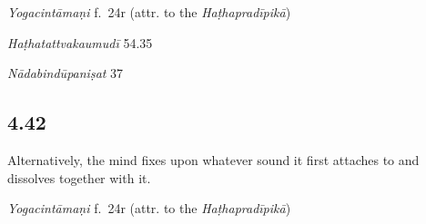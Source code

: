 \begin{ekdosis}

\begin{testimonia}[hp04_041]
\emph{Yogacintāmaṇi} f.~24r (attr. to the \emph{Haṭhapradīpikā})
\begin{versinnote}
\end{versinnote}

\emph{Haṭhatattvakaumudī} 54.35
\begin{versinnote}
\end{versinnote}

\emph{Nādabindūpaniṣat} 37
\begin{versinnote}
\end{versinnote}
\end{testimonia}


\subsection*{4.42}
\begin{translation}[hp04_042]
Alternatively, the mind fixes upon whatever sound it first attaches to and dissolves together with it.
\end{translation}


\begin{testimonia}[hp04_042]
\emph{Yogacintāmaṇi} f.~24r (attr. to the \emph{Haṭhapradīpikā})
\begin{versinnote}
\end{versinnote}


\end{testimonia}
\end{ekdosis}
